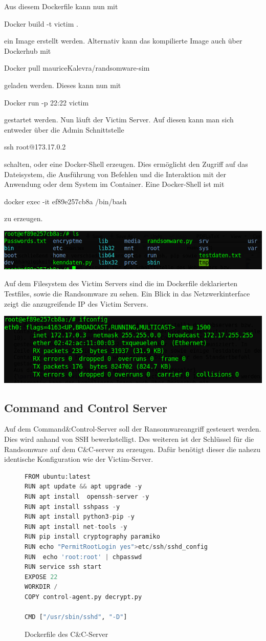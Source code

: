 \documentclass[12pt]{article}
\begin{document}
Aus diesem Dockerfile kann nun mit \colorbox{mshadecolor}{\parbox{0.31\textwidth}{Docker build -t victim .}} ein Image erstellt werden. Alternativ kann das kompilierte Image auch über Dockerhub mit \colorbox{mshadecolor}{\parbox{0.61\textwidth}{Docker pull mauriceKalevra/randsomware-sim}} geladen werden. Dieses kann nun mit \colorbox{mshadecolor}{\parbox{0.36\textwidth}{Docker run -p 22:22 victim}} gestartet werden. Nun läuft der Victim Server. Auf diesen kann man sich entweder über die Admin Schnittstelle  \colorbox{mshadecolor}{\parbox{0.26\textwidth}{ssh root@173.17.0.2}} schalten, oder eine Docker-Shell erzeugen. Dies ermöglicht  den Zugriff auf das Dateisystem, die Ausführung von Befehlen und die Interaktion mit der Anwendung oder dem System im Container. Eine Docker-Shell ist mit \colorbox{mshadecolor}{\parbox{0.51\textwidth}{docker exec -it ef89e257cb8a /bin/bash}} zu erzeugen. 
\begin{center}
 \includegraphics[scale=0.5]{victimS.png}
\end{center}
Auf dem Filesystem des Victim Servers sind die im Dockerfile deklarierten Testfiles, sowie die Randsomware zu sehen. Ein Blick in das Netzwerkinterface zeigt die anzugreifende IP des Victim Servers.
\begin{center}
 \includegraphics[scale=0.3]{victimIp.png}
\end{center}
\newpage
\subsection{Command and Control Server}
Auf dem Command\&Control-Server soll der Ransomwareangriff gesteuert werden. Dies wird anhand von SSH bewerkstelligt. Des weiteren ist der Schlüssel für die Randsomware auf dem C\&C-server zu erzeugen. Dafür benötigt dieser die nahezu identische Konfiguration wie der Victim-Server.
\begin{figure}[h]
\caption{Dockerfile des C\&C-Server}
\begin{lstlisting}[language=python, style=code]
FROM ubuntu:latest
RUN apt update && apt upgrade -y 
RUN apt install  openssh-server -y
RUN apt install sshpass -y
RUN apt install python3-pip -y 
RUN apt install net-tools -y 
RUN pip install cryptography paramiko
RUN echo "PermitRootLogin yes">etc/ssh/sshd_config
RUN  echo 'root:root' | chpasswd
RUN service ssh start
EXPOSE 22
WORKDIR /
COPY control-agent.py decrypt.py 

CMD ["/usr/sbin/sshd", "-D"]
\end{lstlisting}

\end{figure}
\end{document}
